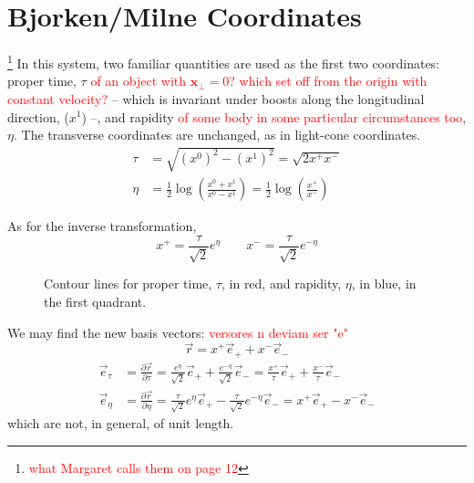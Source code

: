\section{Bjorken/Milne Coordinates}
\label{ap:bjorken_coordinates}
\footnote{\textcolor{red}{what Margaret calls them on page 12}}
In this system, two familiar quantities are used as the first two coordinates: proper time, $\tau$ \textcolor{red}{of an object with $\mathbf{x}_\perp=0$? which set off from the origin with constant velocity?} -- which is invariant under boosts along the longitudinal direction, ($x^1$) --, and rapidity \textcolor{red}{of some body in some particular circumstances too}, $\eta$. The transverse coordinates are unchanged, as in light-cone coordinates.
\begin{equation}
  \begin{split}
    \tau & = \sqrt{(x^0)^2 - (x^1)^2} = \sqrt{2x^+ x^-} \\
    \eta & = \frac{1}{2} \log \left( \frac{x^0+x^1}{x^0-x^1} \right) = \frac{1}{2} \log \left(\frac{x^+}{x^-} \right)
  \end{split}
\end{equation}

As for the inverse transformation,
\begin{equation}
  x^+  = \frac{\tau}{\sqrt{2}} e^\eta \qquad
  x^-  = \frac{\tau}{\sqrt{2}} e^{-\eta}
\end{equation}

\begin{figure}\centering

  \caption{Contour lines for proper time, $\tau$, in red, and rapidity, $\eta$, in blue, in the first quadrant. }
\label{fig:bjorken_coordinates}\end{figure}

We may find the new basis vectors: \textcolor{red}{versores n deviam ser "e"}
\begin{equation*}
  \vec{r} =  x^+ \vec{e}_+ + x^- \vec{e}_-
\end{equation*}
\begin{equation}
  \begin{split}
    \vec{e}_\tau & = \frac{\partial \vec{r}}{\partial \tau} = \frac{e^\eta}{\sqrt{2}} \vec{e}_+ + \frac{e^{-\eta}}{\sqrt{2}} \vec{e}_- = \frac{x^+}{\tau} \vec{e}_+ + \frac{x^-}{\tau} \vec{e}_- \\
    \vec{e}_\eta & = \frac{\partial \vec{r}}{\partial \eta} = \frac{\tau}{\sqrt{2}} e^\eta \vec{e}_+ - \frac{\tau}{\sqrt{2}}e^{-\eta} \vec{e}_- = x^+ \vec{e}_+ - x^- \vec{e}_-
  \end{split}
\end{equation}
\noindent which are not, in general, of unit length.

